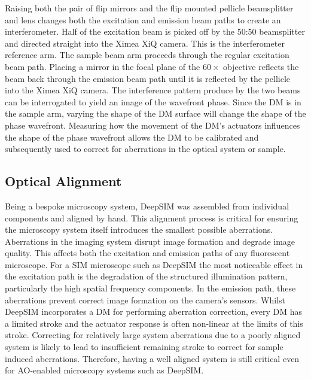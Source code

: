 Raising both the  pair of flip mirrors and the 
flip mounted pellicle beamsplitter and lens changes both the
excitation and emission beam paths to create an interferometer. Half
of the excitation beam is picked off by the 50:50 beamsplitter and
directed straight into the Ximea XiQ camera. This is the
interferometer reference arm. The sample beam arm proceeds through the
regular excitation beam path. Placing a mirror in the focal plane of
the $60\times$ objective reflects the beam back through the emission
beam path until it is reflected by the pellicle into the Ximea XiQ
camera. The interference pattern produce by the two beams can be interrogated to yield an image of the wavefront phase. Since the DM is in the sample arm, varying the shape of the DM surface will change the shape of the phase wavefront. Measuring how the movement of the DM's actuators influences the shape of the phase wavefront allows the DM to be calibrated and subsequently used to correct for aberrations in the optical system or sample. 

\subsection{Optical Alignment}
\label{subsec:alignment}

Being a bespoke microscopy system, DeepSIM was assembled from individual components and aligned by hand. This alignment process is critical for ensuring the microscopy system itself introduces the smallest possible aberrations. Aberrations in the imaging system disrupt image formation and degrade image quality\cite{wyant1992basic}. This affects both the excitation and emission paths of any fluorescent microscope. For a SIM microscope such as DeepSIM the most noticeable effect in the excitation path is the degradation of the structured illumination pattern, particularly the high spatial frequency components\cite{debarre2008adaptive,booth2015aberrations}. In the emission path, these aberrations prevent correct image formation on the camera's sensors. Whilst DeepSIM incorporates a DM for performing aberration correction, every DM has a limited stroke and the actuator response is often non-linear at the limits of this stroke. Correcting for relatively large system aberrations due to a poorly aligned system is likely to lead to insufficient remaining stroke to correct for sample induced aberrations. Therefore, having a well aligned system is still critical even for AO-enabled microscopy systems such as DeepSIM.


